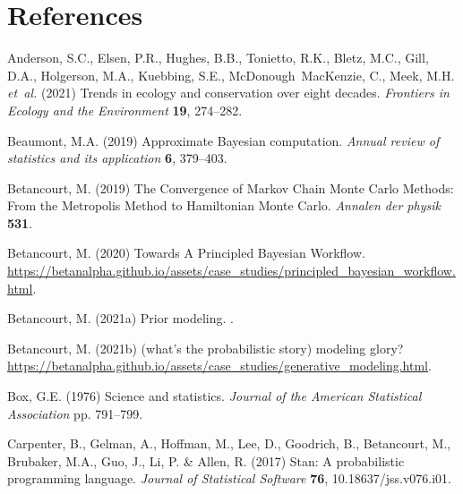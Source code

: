 \documentclass[11pt]{article}
\begin{document}
\section*{References}
\vspace{-5ex}
\begin{thebibliography}{35}
\providecommand{\natexlab}[1]{#1}

Anderson, S.C., Elsen, P.R., Hughes, B.B., Tonietto, R.K., Bletz, M.C., Gill,
  D.A., Holgerson, M.A., Kuebbing, S.E., McDonough~MacKenzie, C., Meek, M.H.
  \emph{et~al.} (2021) Trends in ecology and conservation over eight decades.
  \emph{Frontiers in Ecology and the Environment} \textbf{19}, 274--282.

Beaumont, M.A. (2019) {Approximate Bayesian computation}. \emph{Annual review
  of statistics and its application} \textbf{6}, 379--403.

Betancourt, M. (2019) {The Convergence of Markov Chain Monte Carlo Methods:
  From the Metropolis Method to Hamiltonian Monte Carlo}. \emph{Annalen der
  physik} \textbf{531}.

Betancourt, M. (2020) {Towards A Principled Bayesian Workflow}.
  \url{https://betanalpha.github.io/assets/case_studies/principled_bayesian_workflow.html}.

\bibitem[{Betancourt(2021{\natexlab{a}})}]{betanprior}
Betancourt, M. (2021{\natexlab{a}}) Prior modeling.
  .

\bibitem[{Betancourt(2021{\natexlab{b}})}]{betangen}
Betancourt, M. (2021{\natexlab{b}}) (what's the probabilistic story) modeling
  glory?
  \url{https://betanalpha.github.io/assets/case_studies/generative_modeling.html}.

Box, G.E. (1976) Science and statistics. \emph{Journal of the American
  Statistical Association} pp. 791--799.

Carpenter, B., Gelman, A., Hoffman, M., Lee, D., Goodrich, B., Betancourt, M.,
  Brubaker, M.A., Guo, J., Li, P. \& Allen, R. (2017) Stan: A probabilistic
  programming language. \emph{Journal of Statistical Software} \textbf{76},
  10.18637/jss.v076.i01.


\end{thebibliography}
\end{document}
